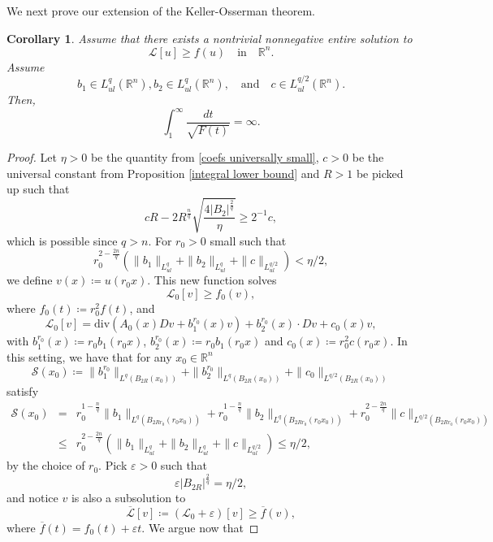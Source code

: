 \documentclass[12pt,a4paper]{amsart}
\numberwithin{equation}{section} %
\newtheorem{corollary}[theorem]{Corollary}
\theoremstyle{definition}
\theoremstyle{remark}
\begin{document}
We next prove our extension of the Keller-Osserman theorem. 

\begin{corollary}\label{keller osserman}
Assume that there exists a nontrivial nonnegative entire solution to
$$
    \mathcal{L}[u] \geq f(u) \quad \text{in} \quad \mathbb{R}^n.
$$
Assume 
$$
    b_1 \in L^{q}_{ul}(\mathbb{R}^n), b_2 \in L^{q}_{ul}(\mathbb{R}^n), \quad \text{and} \quad c \in L^{q/2}_{ul}(\mathbb{R}^n).
$$
Then,
\begin{equation}\label{keller-osserman}
    \int_{1}^{\infty} \frac{dt}{\sqrt{F(t)}} = \infty.
\end{equation}
\end{corollary}

\begin{proof}
Let $\eta>0$ be the quantity from \eqref{coefs universally small}, $c>0$ be the universal constant from Proposition \ref{integral lower bound} and $R>1$ be picked up such that
$$
    cR - 2R^{\frac{n}{q}}\sqrt{\frac{4|B_2|^{\frac{2}{q}}}{\eta}} \geq 2^{-1}c,
$$
which is possible since $q > n$. For $r_0>0$ small such that
$$
    r_0^{2 - \frac{2n}{q}}\left(\|b_1\|_{L^q_{ul}} + \|b_2\|_{L^q_{ul}} + \|c\|_{L^{q/2}_{ul}}  \right) < \eta/2,
$$
we define $v(x) \coloneqq u(r_0 x)$. This new function solves
$$
    \mathcal{L}_0[v] \geq f_0(v),
$$
where $f_0(t) \coloneqq r_0^2 f(t)$, and
$$
    \mathcal{L}_0[v] = \mbox{div}(A_0(x)Dv + b_1^{r_0}(x)v) + b_2^{r_0}(x)\cdot Dv + c_0(x)v,
$$
with $b_1^{r_0}(x) \coloneqq r_0 b_1(r_0 x)$, $b_2^{r_0}(x) \coloneqq r_0 b_1(r_0 x)$ and $c_0(x) \coloneqq r_0^2c(r_0 x)$. In this setting, we have that for any $x_0 \in \mathbb{R}^n$
$$
    \mathcal{S}(x_0) \coloneqq \|b_1^{r_0}\|_{L^{q}(B_{2R}(x_0))} + \|b_2^{r_0}\|_{L^{q}(B_{2R}(x_0))} + \|c_0\|_{L^{q/2}(B_{2R}(x_0))}
$$
satisfy
\begin{eqnarray*}
    \mathcal{S}(x_0) & = & r_0^{1-\frac{n}{q}}\|b_1\|_{L^{q}(B_{2Rr_0}(r_0x_0))} + r_0^{1-\frac{n}{q}}\|b_2\|_{L^{q}(B_{2Rr_0}(r_0x_0))} + r_0^{2-\frac{2n}{q}}\|c\|_{L^{q/2}(B_{2Rr_0}(r_0x_0))}\\
    & \leq & r_0^{2-\frac{2n}{q}}\left(\|b_1\|_{L^{q}_{ul}}+\|b_2\|_{L^{q}_{ul}}+\|c\|_{L^{q/2}_{ul}}\right) \leq \eta/2,
\end{eqnarray*}
by the choice of $r_0$. Pick $\varepsilon>0$ such that 
$$
    \varepsilon |B_{2R}|^{\frac{2}{q}} = \eta/2,
$$
and notice $v$ is also a subsolution to
$$
   \overline{\mathcal{L}}[v] \coloneqq \left(\mathcal{L}_0+\varepsilon\right)[v] \geq \overline{f}(v),
$$
where $\overline{f}(t) = f_0(t) + \varepsilon t$. We argue now that

\end{proof}
\end{document}
